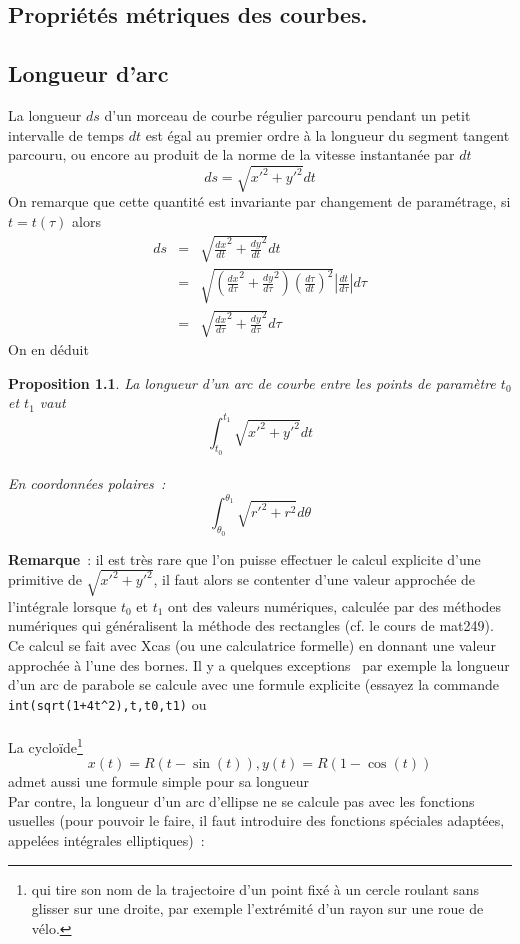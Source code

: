 \documentclass[a4paper,11pt]{book}
\newtheorem{prop}[thm]{Proposition}
\begin{document}
\begin{giacjshere}
\chapter{Propri\'et\'es m\'etriques des courbes.} \label{sec:courbes_m}
\section{Longueur d'arc}
La longueur $ds$ d'un morceau de courbe r\'egulier parcouru
pendant un petit intervalle de temps $dt$ est égal
au premier ordre à la longueur du segment tangent parcouru,
ou encore au produit de la norme de la vitesse instantanée 
par $dt$
$$ ds=\sqrt{x'^2+y'^2} dt$$
On remarque que cette quantit\'e est invariante par changement de 
param\'etrage, si $t=t(\tau)$ alors
\begin{eqnarray*} 
ds &= & \sqrt{\frac{dx}{dt}^2+\frac{dy}{dt}^2} dt \\
&=& \sqrt{ \left(\frac{dx}{d\tau}^2+\frac{dy}{d\tau}^2\right) 
\left(\frac{d\tau}{dt}\right)^2} |\frac{dt}{d\tau}| d\tau \\
& = & \sqrt{ \frac{dx}{d\tau}^2+\frac{dy}{d\tau}^2} d\tau
\end{eqnarray*}
On en déduit
\begin{prop} 
La longueur d'un arc de courbe entre les points
de paramètre $t_0$ et $t_1$ vaut
$$ \int_{t_0}^{t_1} \sqrt{x'^2+y'^2} dt$$\\
En coordonn\'ees polaires~:
$$ \int_{\theta_0}^{\theta_1} \sqrt{r'^2+r^2} d\theta$$
\end{prop}

{\bf Remarque}~: il est très rare que l'on puisse effectuer
le calcul explicite d'une primitive de $\sqrt{x'^2+y'^2}$,
il faut alors se contenter d'une valeur approchée de l'intégrale
lorsque $t_0$ et $t_1$ ont des valeurs numériques, calculée
par des méthodes numériques qui généralisent la méthode
des rectangles (cf. le cours de mat249).
Ce calcul se fait avec Xcas (ou une calculatrice formelle) en donnant
une valeur approchée à l'une des bornes.
Il y a quelques exceptions~ par exemple la longueur d'un arc de 
parabole se calcule avec une formule explicite (essayez la
commande \verb|int(sqrt(1+4t^2),t,t0,t1)| ou\\
\\
La cyclo\"ide\footnote{qui tire
son nom de la trajectoire d'un point fix\'e \`a un cercle roulant
sans glisser sur une droite, par exemple l'extr\'emit\'e d'un rayon 
sur une roue de v\'elo.} 
$$ x(t)=R(t-\sin(t)), y(t)=R(1-\cos(t))$$
admet aussi une formule simple pour sa longueur 
\\
Par contre, la
longueur d'un arc d'ellipse ne se calcule pas avec les fonctions
usuelles (pour pouvoir le faire, il faut introduire des fonctions spéciales
adaptées, appel\'ees int\'egrales elliptiques)~:\\



\end{giacjshere}
\end{document}
